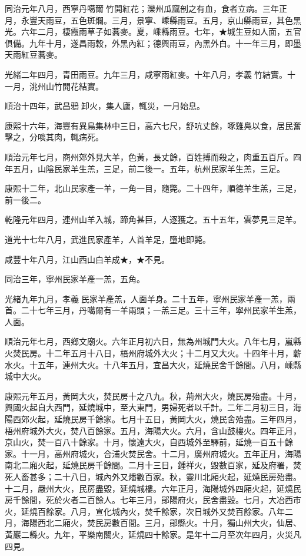 \begin{pinyinscope}
同治元年八月，西寧丹噶爾竹開紅花；灤州瓜窳剖之有血，食者立病。三年正月，永豐天雨豆，五色斑爛。三月，景寧、嵊縣雨豆。五月，京山縣雨豆，其色黑光。六年二月，棲霞雨草子如蕎麥。夏，嵊縣雨豆。七年，★城生豆如人面，五官俱備。九年十月，遂昌雨穀，外黑內紅；德興雨豆，內黑外白。十一年三月，即墨天雨紅豆蕎麥。

光緒二年四月，青田雨豆。九年三月，咸寧雨紅麥。十年八月，孝義竹結實。十一月，洮州山竹開花結實。

順治十四年，武昌鴉卸火，集人廬，輒災，一月始息。

康熙十六年，海豐有異鳥集林中三日，高六七尺，舒吭丈餘，啄雞鳧以食，居民奮擊之，分啖其肉，輒病死。

順治元年七月，商州郊外見大羊，色黃，長丈餘，百姓搏而殺之，肉重五百斤。四年五月，山陰民家羊生羔，三足，前二後一。五年，杭州民家羊生羔，三足。

康熙十二年，北山民家產一羊，一角一目，隨斃。二十四年，順德羊生羔，三足，前一後二。

乾隆元年四月，連州山羊入城，蹄角甚巨，人逐獲之。五十五年，雲夢見三足羊。

道光十七年八月，武進民家產羊，人首羊足，墮地即斃。

咸豐十年八月，江山西山白羊成★，★不見。

同治三年，寧州民家羊產一羔，五角。

光緒九年九月，孝義民家羊產羔，人面羊身。二十五年，寧州民家羊產一羔，兩首。二十七年三月，丹噶爾有一羊兩頭；一羔三足。三十三年，寧州民家羊生羔，人面。

順治元年七月，西鄉文廟火。六年正月初六日，無為州城門大火。八年七月，嵐縣火焚民房。十二年五月十八日，梧州府城外大火；十二月又大火。十四年十月，蘄水火。十五年，連州大火。十八年五月，宜昌大火，延燒民舍千餘間。八月，嵊縣城中大火。

康熙元年五月，黃岡大火，焚民房十之八九。秋，荊州大火，燒民房殆盡。十月，興國火起自大西門，延燒城中，至大東門，男婦死者以千計。二年二月初三日，海陽西郊火起，延燒民房千餘家。七月十五日，黃岡大火，燒民舍殆盡。三年四月，梧州府城外大火，焚八百餘家。五月，海陽大火。六月，含山鼓樓火。四年正月，京山火，焚一百八十餘家。十月，懷遠大火，自西城外至驛前，延燒一百五十餘家。十一月，高州府城火，合浦火焚民舍。十二月，廣州府城火。五年正月，海陽南北二廂火起，延燒民房千餘間。二月十三日，鍾祥火，毀數百家，延及府署，焚死人畜甚多；二十八日，城內外又燔數百家。秋，靈川北廂火起，延燒民房殆盡。十二月，嚴州大火，民房盡毀，延燒城樓。六年正月，海陽城外四廂火起，延燒民房千餘間，死於火者二百餘人。七年三月，鄖陽府火，民舍盡毀。七月，大冶西市火，延燒百餘家。八月，宣化城內火，焚千餘家，次日城外又焚百餘家。八年二月，海陽西北二廂火，焚民房數百間。三月，鄖縣火。十月，獨山州大火，仙居、黃巖二縣火。九年，平樂南關火，延燒四十餘家。是年十二月至次年四月，火災凡四見。


\end{pinyinscope}
